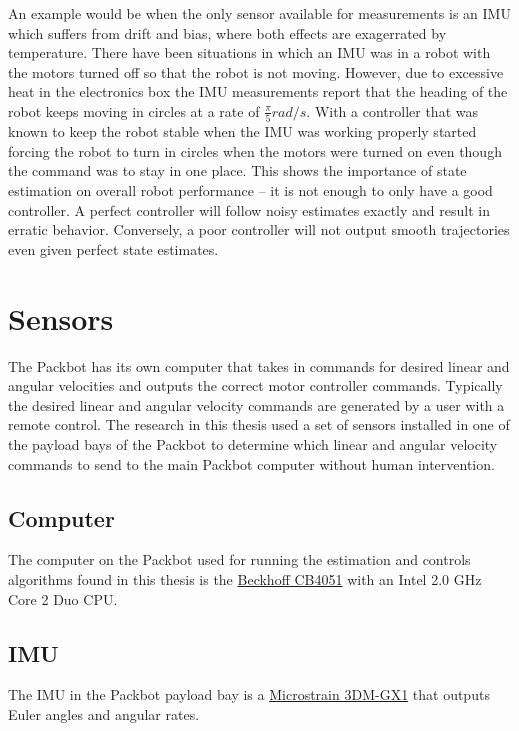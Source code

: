 An example would be when the only sensor available for measurements is an IMU which suffers from drift and bias, where both effects are exagerrated by temperature. There have been situations in which an IMU was in a robot with the motors turned off so that the robot is not moving. However, due to excessive heat in the electronics box the IMU measurements report that the heading of the robot keeps moving in circles at a rate of $\frac{\pi}{5} rad/s$. With a controller that was known to keep the robot stable when the IMU was working properly started forcing the robot to turn in circles when the motors were turned on even though the command was to stay in one place. This shows the importance of state estimation on overall robot performance -- it is not enough to only have a good controller. A perfect controller will follow noisy estimates exactly and result in erratic behavior. Conversely, a poor controller will not output smooth trajectories even given perfect state estimates.

\section{Sensors}
\label{sec:bgSensors}
The Packbot has its own computer that takes in commands for desired linear and angular velocities and outputs the correct motor controller commands. Typically the desired linear and angular velocity commands are generated by a user with a remote control. The research in this thesis used a set of sensors installed in one of the payload bays of the Packbot to determine which linear and angular velocity commands to send to the main Packbot computer without human intervention.

\subsection{Computer}
\label{sec:bgComputer}
The computer on the Packbot used for running the estimation and controls algorithms found in this thesis is the \href{http://www.beckhoff.com/english.asp?motherboards/cb4051.htm}{Beckhoff CB4051} with an Intel 2.0 GHz Core 2 Duo CPU.

\subsection{IMU}
\label{sec:bgIMU}
The IMU in the Packbot payload bay is a \href{http://www.microstrain.com/3dm-gx1.aspx}{Microstrain 3DM-GX1} that outputs Euler angles and angular rates.

